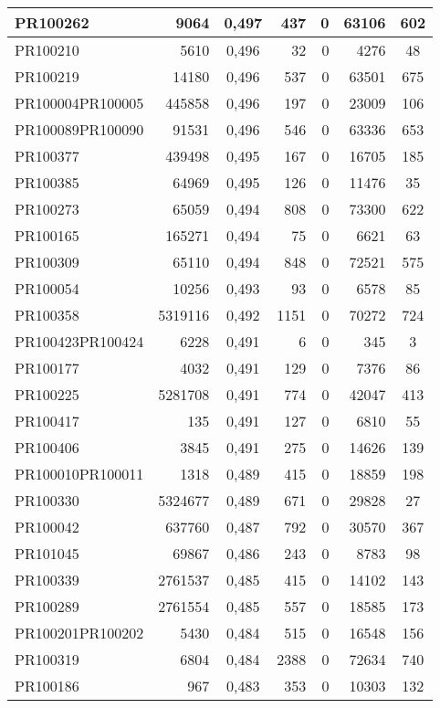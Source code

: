 \begin{center}
\begin{longtable}{lr|c|rrr|c}
	PR100262 & 9064 & 0,497 & 437 & 0 & 63106 & 602 \\ \hline
	PR100210 & 5610 & 0,496 & 32 & 0 & 4276 & 48 \\ \hline
	PR100219 & 14180 & 0,496 & 537 & 0 & 63501 & 675 \\ \hline
	PR100004PR100005 & 445858 & 0,496 & 197 & 0 & 23009 & 106 \\ \hline
	PR100089PR100090 & 91531 & 0,496 & 546 & 0 & 63336 & 653 \\ \hline
	PR100377 & 439498 & 0,495 & 167 & 0 & 16705 & 185 \\ \hline
	PR100385 & 64969 & 0,495 & 126 & 0 & 11476 & 35 \\ \hline
	PR100273 & 65059 & 0,494 & 808 & 0 & 73300 & 622 \\ \hline
	PR100165 & 165271 & 0,494 & 75 & 0 & 6621 & 63 \\ \hline
	PR100309 & 65110 & 0,494 & 848 & 0 & 72521 & 575 \\ \hline
	PR100054 & 10256 & 0,493 & 93 & 0 & 6578 & 85 \\ \hline
	PR100358 & 5319116 & 0,492 & 1151 & 0 & 70272 & 724 \\ \hline
	PR100423PR100424 & 6228 & 0,491 & 6 & 0 & 345 & 3 \\ \hline
	PR100177 & 4032 & 0,491 & 129 & 0 & 7376 & 86 \\ \hline
	PR100225 & 5281708 & 0,491 & 774 & 0 & 42047 & 413 \\ \hline
	PR100417 & 135 & 0,491 & 127 & 0 & 6810 & 55 \\ \hline
	PR100406 & 3845 & 0,491 & 275 & 0 & 14626 & 139 \\ \hline
	PR100010PR100011 & 1318 & 0,489 & 415 & 0 & 18859 & 198 \\ \hline
	PR100330 & 5324677 & 0,489 & 671 & 0 & 29828 & 27 \\ \hline
	PR100042 & 637760 & 0,487 & 792 & 0 & 30570 & 367 \\ \hline
	PR101045 & 69867 & 0,486 & 243 & 0 & 8783 & 98 \\ \hline
	PR100339 & 2761537 & 0,485 & 415 & 0 & 14102 & 143 \\ \hline
	PR100289 & 2761554 & 0,485 & 557 & 0 & 18585 & 173 \\ \hline
	PR100201PR100202 & 5430 & 0,484 & 515 & 0 & 16548 & 156 \\ \hline
	PR100319 & 6804 & 0,484 & 2388 & 0 & 72634 & 740 \\ \hline
	PR100186 & 967 & 0,483 & 353 & 0 & 10303 & 132 \\ \hline

\end{longtable}
\end{center}
